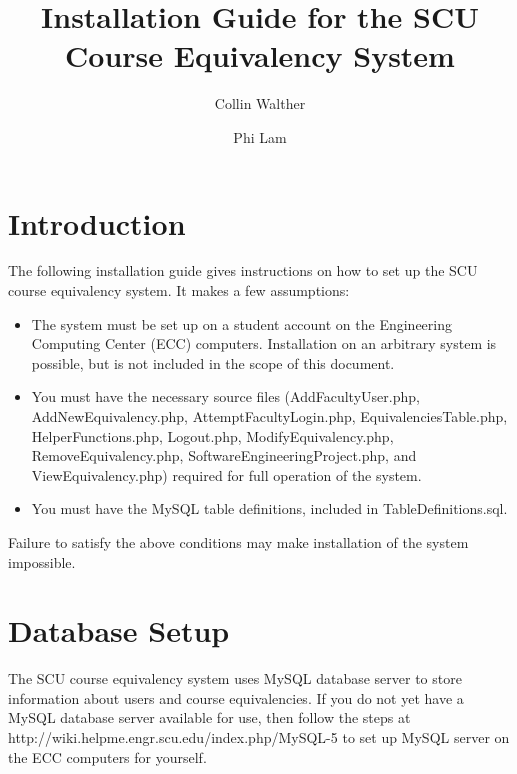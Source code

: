 \documentclass{article}
\author{Collin Walther \and Phi Lam}
\title{Installation Guide for the SCU Course Equivalency System}
\begin{document}
\maketitle

\section{Introduction}
\par The following installation guide gives instructions on how to set up the
SCU course equivalency system. It makes a few assumptions:
\begin{itemize}
\item The system must be set up on a student account on the Engineering Computing
Center (ECC) computers.
Installation on an arbitrary system is possible, but is not included in the scope
of this document.
\item You must have the necessary source files
(AddFacultyUser.php, AddNewEquivalency.php, AttemptFacultyLogin.php,
EquivalenciesTable.php, HelperFunctions.php, Logout.php, ModifyEquivalency.php,
RemoveEquivalency.php, SoftwareEngineeringProject.php, and ViewEquivalency.php)
required for full operation of the system.
\item You must have the MySQL table definitions, included in
TableDefinitions.sql.
\end{itemize}
Failure to satisfy the above conditions may make installation of the system
impossible.

\section{Database Setup}
\par The SCU course equivalency system uses MySQL database server to store
information about users and course equivalencies. If you do not yet have a MySQL
database server available for use, then follow the steps at
http://wiki.helpme.engr.scu.edu/index.php/MySQL-5 to set up MySQL server on the
ECC computers for yourself.
\end{document}
